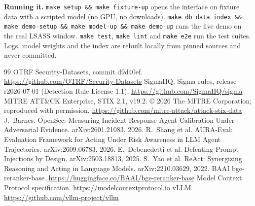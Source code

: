 \documentclass[11pt,a4paper]{article}
\newcommand{\code}[1]{\texttt{\small #1}}
\begin{document}
\textbf{Running it.} \code{make setup \&\& make fixture-up} opens the interface on fixture data with a scripted model (no GPU, no downloads). \code{make db data index \&\& make demo-setup \&\& make model-up \&\& make demo-up} runs the live demo on the real LSASS window. \code{make test}, \code{make lint} and \code{make e2e} run the test suites. Logs, model weights and the index are rebuilt locally from pinned sources and never committed.

\begingroup
\footnotesize
\renewcommand{\section}[2]{\vspace{4pt}\textbf{\large References}\par\vspace{2pt}}
\begin{thebibliography}{99}
\setlength{\itemsep}{0pt}
 OTRF Security-Datasets, commit d9d40ef. \url{https://github.com/OTRF/Security-Datasets}
 SigmaHQ, Sigma rules, release r2026-07-01 (Detection Rule License 1.1). \url{https://github.com/SigmaHQ/sigma}
 MITRE ATT\&CK\textregistered{} Enterprise, STIX 2.1, v19.2. \copyright{} 2026 The MITRE Corporation; reproduced with permission. \url{https://github.com/mitre-attack/attack-stix-data}
 J.~Barnes. OpenSec: Measuring Incident Response Agent Calibration Under Adversarial Evidence. arXiv:2601.21083, 2026.
 R.~Shang et al. AURA-Eval: Evaluation Framework for Acting Under Risk Awareness in LLM Agent Trajectories. arXiv:2609.06783, 2026.
 E.~Debenedetti et al. Defeating Prompt Injections by Design. arXiv:2503.18813, 2025.
 S.~Yao et al. ReAct: Synergizing Reasoning and Acting in Language Models. arXiv:2210.03629, 2022.
 BAAI bge-reranker-base. \url{https://huggingface.co/BAAI/bge-reranker-base}
 Model Context Protocol specification. \url{https://modelcontextprotocol.io}
 vLLM. \url{https://github.com/vllm-project/vllm}
\end{thebibliography}
\endgroup
\end{document}
